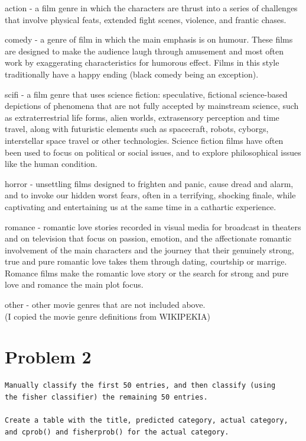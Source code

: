 \documentclass[12pt]{article}
\begin{document}
\noindent
action - a film genre in which the characters are thrust into a series of challenges that involve physical feats, extended fight scenes, violence, and frantic chases.

\noindent
comedy - a genre of film in which the main emphasis is on humour. These films are designed to make the audience laugh through amusement and most often work by exaggerating characteristics for humorous effect. Films in this style traditionally have a happy ending (black comedy being an exception).

\noindent
scifi - a film genre that uses science fiction: speculative, fictional science-based depictions of phenomena that are not fully accepted by mainstream science, such as extraterrestrial life forms, alien worlds, extrasensory perception and time travel, along with futuristic elements such as spacecraft, robots, cyborgs, interstellar space travel or other technologies. Science fiction films have often been used to focus on political or social issues, and to explore philosophical issues like the human condition.

\noindent
horror - unsettling films designed to frighten and panic, cause dread and alarm, and to invoke our hidden worst fears, often in a terrifying, shocking finale, while captivating and entertaining us at the same time in a cathartic experience.

\noindent
romance - romantic love stories recorded in visual media for broadcast in theaters and on television that focus on passion, emotion, and the affectionate romantic involvement of the main characters and the journey that their genuinely strong, true and pure romantic love takes them through dating, courtship or marrige. Romance films make the romantic love story or the search for strong and pure love and romance the main plot focus.

\noindent
other - other movie genres that are not included above.\\
(I copied the movie genre definitions from WIKIPEKIA)



\section*{Problem 2}

\begin{verbatim}
Manually classify the first 50 entries, and then classify (using
the fisher classifier) the remaining 50 entries. 

Create a table with the title, predicted category, actual category,
and cprob() and fisherprob() for the actual category.
\end{verbatim}
\end{document}
